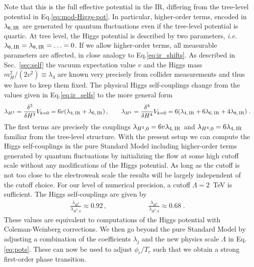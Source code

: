 \documentclass[aps,prd,11pt,tightenlines,superscriptaddress,nofootinbib,preprintnumbers,notitlepage]{revtex4-1}
\newcommand{\qqqquad}{\qquad \qquad \qquad}
\newcommand{\ie}{\textsl{i.e.}\;}
\begin{document}
%
Note that this is the full effective potential in the IR, differing
from the tree-level potential in Eq.\eqref{eq:mod-Higgs-pot}. In
particular, higher-order terms, encoded in $\lambda_{6,\, \rm IR }$
are generated by quantum fluctuations even if the tree-level potential
is quartic.  At tree level, the Higgs potential is described by two
parameters, \ie
$\lambda_{6,\,\rm IR} = \lambda_{8,\,\rm IR} = \ldots =0$.  If we
allow higher-order terms, all measurable parameters are affected, in
close analogy to Eq.\eqref{eq:ir_shifts}.  As described in
Sec.~\ref{sec:self} the vacuum expectation value $v$ and the Higgs
mass $m_H^2/(2v^2) \equiv \lambda_4$ are known very precisely from
collider measurements and thus we have to keep them fixed.  The
physical Higgs self-couplings change from the values given in
Eq.\eqref{eq:ir_selfs} to the more general form
%
\begin{align}
 \lambda_{H^3} = \frac{\delta^3}{\delta H^3} V_{k=0} 
	       =  6 v(\lambda_{4,\,\rm IR} + \lambda_{6,\,\rm IR})\,, \qquad 
 \lambda_{H^4} = \frac{\delta^4}{\delta H^4} V_{k=0} 
	       = 6 (\lambda_{4,\,\rm IR}  + 6 \lambda_{6,\,\rm IR}  + 4 \lambda_{8,\,\rm IR})  \; .
\end{align}
%
The first terms are precisely the couplings
$\lambda_{H^3,0}=6 v\lambda_{4,\,\rm IR}$ and
$\lambda_{H^4,0}=6 \lambda_{4,\,\rm IR}$ familiar from the tree-level
structure.  With the present setup we can compute the Higgs
self-couplings in the pure Standard Model including higher-order terms
generated by quantum fluctuations by initializing the flow at some
high cutoff scale without any modifications of the Higgs potential. As
long as the cutoff is not too close to the electroweak scale the
results will be largely independent of the cutoff choice. For our
level of numerical precision, a cutoff $\Lambda=2$~TeV is sufficient.
The Higgs self-couplings are given by
%
\begin{align}
 \frac{\lambda_{H^3}}{\lambda_{H^3,0}} \approx 0.92\,, \qqqquad 
 \frac{\lambda_{H^4}}{\lambda_{H^4,0}} \approx 0.68 \;.
 \label{eq:Higgs-self-SM}
\end{align}
%
These values are equivalent to computations of the Higgs potential
with Coleman-Weinberg corrections.  We then go beyond the pure
Standard Model by adjusting a combination of the coefficients
$\lambda_j$ and the new physics scale $\Lambda$ in
Eq.\eqref{eq:pots}. These can now be used to adjust $\phi_c/T_c$ such
that we obtain a strong first-order phase transition.

\end{document}
